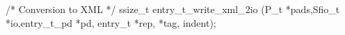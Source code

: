\begin{code}
/* Conversion to XML */
ssize\_t entry\_t\_write\_xml\_2io (P\_t *pads,Sfio\_t *io,entry\_t\_pd *pd,
                               entry\_t *rep,  *tag, indent);
\end{code}
